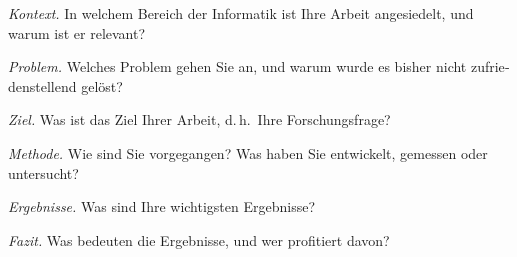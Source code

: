 \begin{otherlanguage}{ngerman}



\textit{Kontext.}
In welchem Bereich der Informatik ist Ihre Arbeit angesiedelt, und warum ist er relevant?

\textit{Problem.}
Welches Problem gehen Sie an, und warum wurde es bisher nicht zufriedenstellend gelöst?

\textit{Ziel.}
Was ist das Ziel Ihrer Arbeit, d.\,h.\ Ihre Forschungsfrage?

\textit{Methode.}
Wie sind Sie vorgegangen?
Was haben Sie entwickelt, gemessen oder untersucht?

\textit{Ergebnisse.}
Was sind Ihre wichtigsten Ergebnisse?

\textit{Fazit.}
Was bedeuten die Ergebnisse, und wer profitiert davon?
\end{otherlanguage}
